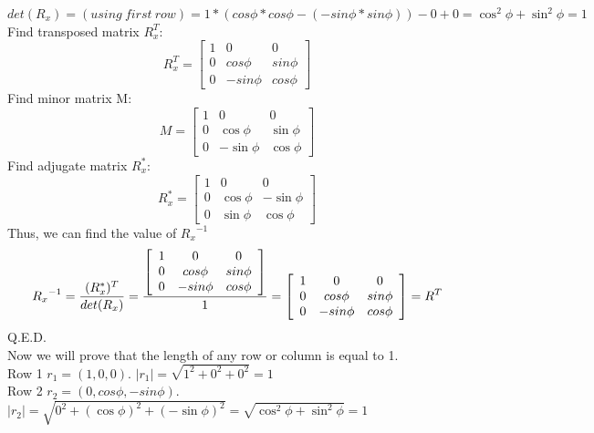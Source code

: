 \documentclass[a4paper, twoside, english]{article}
\begin{document}
${det(R_x)=(using\ first\ row)=1*(cos \phi * cos \phi - (-sin \phi * sin \phi)) - 0 + 0 = \cos^2 \phi + \sin^2 \phi = 1}$\\
Find transposed matrix $R_x^T$:
\begin{equation*}
	{R_x^T} = \left[
	\begin{array}{ccc}
		1 & 0 & 0 \\
		0 & cos \phi & sin \phi \\
		0 & -sin \phi & cos \phi
	\end{array}
	\right]
	\label{eq:kmatrixXT}
\end{equation*}
Find minor matrix M:
\begin{equation*}
	M=\left[
	\begin{array}{ccc}
		1&0&0\\
		0&\cos\phi&\sin\phi\\
		0&-\sin\phi&\cos\phi
	\end{array}
	\right]
\end{equation*}
Find adjugate matrix $R_x^{*}$:
\begin{equation*}
R_x^{*}=	\left[
	\begin{array}{ccc}
		1&0&0\\
		0&\cos\phi&-\sin\phi\\
		0&\sin\phi&\cos\phi
	\end{array}
	\right]
\end{equation*}
Thus, we can find the value of ${R_x}^{-1}$
\begin{equation*}
{{R_x}^{-1}}={{(R_x^{*})^T}\over{det(R_x)}}= {{\left[ \begin{array}{ccc}
	1 & 0 & 0 \\
	0 & cos \phi & sin \phi \\
	0 & -sin \phi & cos \phi
\end{array} \right]}\over {1}} =  {\left[ \begin{array}{ccc}
1 & 0 & 0 \\
0 & cos \phi & sin \phi \\
0 & -sin \phi & cos \phi
\end{array} \right]} = R^T
\end{equation*} Q.E.D.\\
Now we will prove that the length of any row or column is equal to 1.\\
 {Row 1 $r_1=(1,0,0)$. ${{|r_1|}={\sqrt{1^2+0^2+0^2}}=1}$}\\
 {Row 2 $r_2=(0, cos \phi , -sin \phi )$. ${|r_2|}={\sqrt{0^2+(\cos\phi)^2+(-\sin \phi)^2}}={\sqrt{ \cos^2 \phi + \sin^2 \phi}} = 1$}\\
\end{document}
